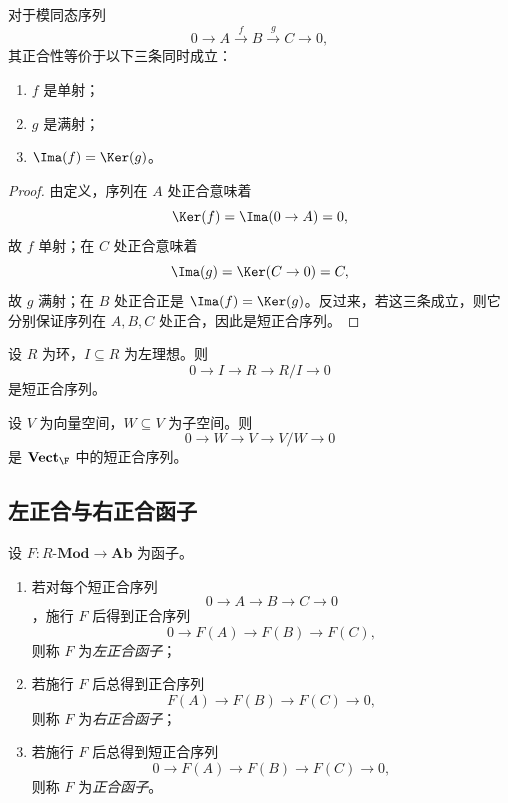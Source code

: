 \begin{proposition}
对于模同态序列
\[
  0\longrightarrow A\xrightarrow{f} B\xrightarrow{g} C\longrightarrow 0,
\]
其正合性等价于以下三条同时成立：
\begin{enumerate}[label=(\arabic*), leftmargin=2.5em]
  \item $f$ 是单射；
  \item $g$ 是满射；
  \item $\Ima(f)=\Ker(g)$。
\end{enumerate}
\end{proposition}

\begin{proof}
由定义，序列在 $A$ 处正合意味着
\[
  \Ker(f)=\Ima(0\to A)=0,
\]
故 $f$ 单射；在 $C$ 处正合意味着
\[
  \Ima(g)=\Ker(C\to 0)=C,
\]
故 $g$ 满射；在 $B$ 处正合正是 $\Ima(f)=\Ker(g)$。反过来，若这三条成立，则它分别保证序列在 $A,B,C$ 处正合，因此是短正合序列。
\end{proof}

\begin{example}
设 $R$ 为环，$I\subseteq R$ 为左理想。则
\[
  0\longrightarrow I\longrightarrow R\longrightarrow R/I\longrightarrow 0
\]
是短正合序列。
\end{example}

\begin{example}
设 $V$ 为向量空间，$W\subseteq V$ 为子空间。则
\[
  0\longrightarrow W\longrightarrow V\longrightarrow V/W\longrightarrow 0
\]
是 $\mathbf{Vect}_{\F}$ 中的短正合序列。
\end{example}

\subsection{左正合与右正合函子}

\begin{definition}
设 $F\colon R\text{-}\mathbf{Mod}\to \mathbf{Ab}$ 为函子。
\begin{enumerate}[label=(\arabic*), leftmargin=2.5em]
  \item 若对每个短正合序列
  \[
    0\to A\to B\to C\to 0
  \]
  ，施行 $F$ 后得到正合序列
  \[
    0\to F(A)\to F(B)\to F(C),
  \]
  则称 $F$ 为\emph{左正合函子}；
  \item 若施行 $F$ 后总得到正合序列
  \[
    F(A)\to F(B)\to F(C)\to 0,
  \]
  则称 $F$ 为\emph{右正合函子}；
  \item 若施行 $F$ 后总得到短正合序列
  \[
    0\to F(A)\to F(B)\to F(C)\to 0,
  \]
  则称 $F$ 为\emph{正合函子}。
\end{enumerate}
\end{definition}

